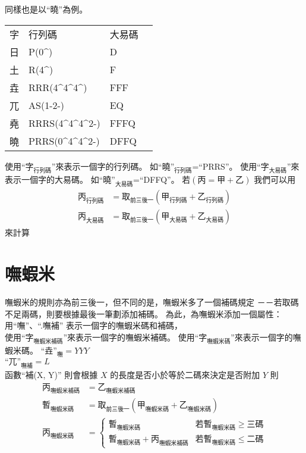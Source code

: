 \documentclass{article}
\def\tac{\textasciicircum}
\begin{document}
同樣也是以``曉''為例。
\begin{tabular}{llll}
字  & 行列碼 & 大易碼\\
日  & P(0\tac) & D\\
土  & R(4\tac) & F\\
垚  & RRR(4\tac4\tac4\tac) & FFF\\
兀  & AS(1-2-) & EQ\\
堯  & RRRS(4\tac4\tac4\tac2-) & FFFQ\\
曉  & PRRS(0\tac4\tac4\tac2-) & DFFQ\\
\end{tabular}

使用``$\mbox{字}_{\mbox{行列碼}}$''來表示一個字的行列碼。
如$\mbox{``曉''}_{\mbox{行列碼}}$=``PRRS''。
使用``$\mbox{字}_{\mbox{大易碼}}$''來表示一個字的大易碼。
如$\mbox{``曉''}_{\mbox{大易碼}}$=``DFFQ''。
若$(\mbox{丙}=\mbox{甲}+\mbox{乙})$
我們可以用
\begin{subequations}
  \begin{align}
  \mbox{丙}_{\mbox{行列碼}}&=\mbox{取}_{\mbox{前三後一}}(\mbox{甲}_{\mbox{行列碼}}+\mbox{乙}_{\mbox{行列碼}})\\
  \mbox{丙}_{\mbox{大易碼}}&=\mbox{取}_{\mbox{前三後一}}(\mbox{甲}_{\mbox{大易碼}}+\mbox{乙}_{\mbox{大易碼}})
  \end{align}
\end{subequations}
來計算

\section{嘸蝦米}
嘸蝦米的規則亦為前三後一，但不同的是，嘸蝦米多了一個補碼規定
－－若取碼不足兩碼，則要根據最後一筆劃添加補碼。
為此，為嘸蝦米添加一個屬性：
用``嘸''、``.嘸補'' 表示一個字的嘸蝦米碼和補碼，\\
使用``$\mbox{字}_{\mbox{嘸蝦米補碼}}$''來表示一個字的嘸蝦米補碼。
使用``$\mbox{字}_{\mbox{嘸蝦米碼}}$''來表示一個字的嘸蝦米碼。
$\mbox{``垚''}_{\mbox{嘸}}=YYY$\\
$\mbox{``兀''}_{\mbox{嘸補}}=L$\\
函數``\mbox{補}(X, Y)'' 則會根據 $X$ 的長度是否小於等於二碼來決定是否附加 $Y$
則
\begin{subequations}
  \begin{align}
  \mbox{丙}_{\mbox{嘸蝦米補碼}}&=\mbox{乙}_{\mbox{嘸蝦米補碼}}\\
  \mbox{暫}_{\mbox{嘸蝦米碼}}&=\mbox{取}_{\mbox{前三後一}}(\mbox{甲}_{\mbox{嘸蝦米碼}}+\mbox{乙}_{\mbox{嘸蝦米碼}})\\
  \mbox{丙}_{\mbox{嘸蝦米碼}}&= \left\{\begin{array}{ll}
        \mbox{暫}_{\mbox{嘸蝦米碼}} & \mbox{若$\mbox{暫}_{\mbox{嘸蝦米碼}} \geq $三碼}\\
        \mbox{暫}_{\mbox{嘸蝦米碼}}+\mbox{丙}_{\mbox{嘸蝦米補碼}} & \mbox{若$\mbox{暫}_{\mbox{嘸蝦米碼}} \leq $二碼}
      \end{array}\right.
  \end{align}
\end{subequations}
\end{document}
